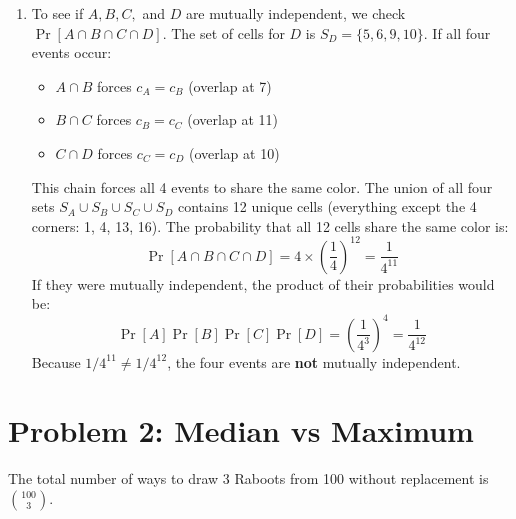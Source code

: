 \documentclass[11pt]{article}
\begin{document}
\begin{enumerate}[label=\textbf{(\alph*)}]
\begin{itemize}
        \item \textbf{Three-way $A \cap B \cap C$:} We examine the union $S_A \cup S_B \cup S_C$. As established, $A \cap B$ forces $c_A = c_B$, and $B \cap C$ forces $c_B = c_C$. Therefore, all cells across the three sets must share a single color. There are $4 + 3 + 3 = 10$ unique cells.
        $$\Pr[A \cap B \cap C] = 4 \times \left(\frac{1}{4}\right)^{10} = \frac{1}{4^9} = \left(\frac{1}{4^3}\right)^3 = \Pr[A]\Pr[B]\Pr[C]$$
    \end{itemize}
    Since all 4 conditions hold, $A, B,$ and $C$ are mutually independent.

    \item To see if $A, B, C,$ and $D$ are mutually independent, we check $\Pr[A \cap B \cap C \cap D]$.
    The set of cells for $D$ is $S_D = \{5, 6, 9, 10\}$. 
    If all four events occur:
    \begin{itemize}
        \item $A \cap B$ forces $c_A = c_B$ (overlap at 7)
        \item $B \cap C$ forces $c_B = c_C$ (overlap at 11)
        \item $C \cap D$ forces $c_C = c_D$ (overlap at 10)
    \end{itemize}
    This chain forces all 4 events to share the same color. The union of all four sets $S_A \cup S_B \cup S_C \cup S_D$ contains 12 unique cells (everything except the 4 corners: 1, 4, 13, 16).
    The probability that all 12 cells share the same color is:
    $$\Pr[A \cap B \cap C \cap D] = 4 \times \left(\frac{1}{4}\right)^{12} = \frac{1}{4^{11}}$$
    If they were mutually independent, the product of their probabilities would be:
    $$\Pr[A]\Pr[B]\Pr[C]\Pr[D] = \left(\frac{1}{4^3}\right)^4 = \frac{1}{4^{12}}$$
    Because $1/4^{11} \neq 1/4^{12}$, the four events are \textbf{not} mutually independent.
\end{enumerate}

\vspace{0.5cm}

\section*{Problem 2: Median vs Maximum}
The total number of ways to draw 3 Raboots from 100 without replacement is $\binom{100}{3}$.
\end{document}
